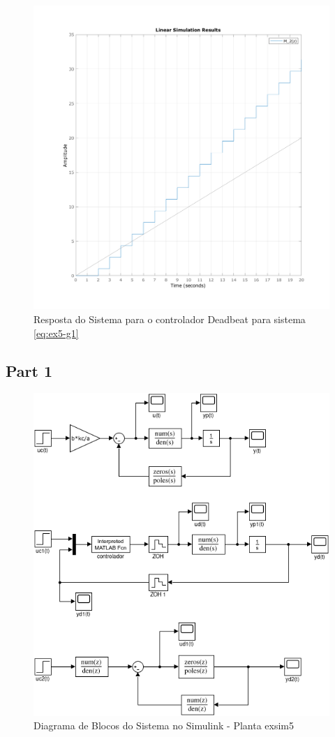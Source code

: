\documentclass[a4paper,11pt]{article}
\begin{document}
\begin{figure}[H]
    \centering
    \includegraphics[width=0.6\linewidth]{img/exsim5-g2-deadbeat-sim.png}
    \caption{Resposta do Sistema para o controlador Deadbeat para sistema \ref{eq:ex5-g1}}
\end{figure}

\subsection{Part 1}

\begin{figure}[H]
    \centering
    \includegraphics[width=0.9\linewidth]{img/exsim5model.png}
    \caption{Diagrama de Blocos do Sistema no Simulink - Planta exsim5}
\end{figure}
\end{document}
